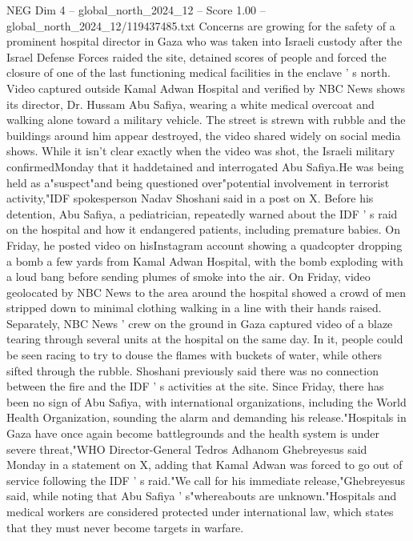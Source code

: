 \begin{textsample}{NEG Dim 4 – global\_north\_2024\_12 – Score 1.00 – global\_north\_2024\_12/119437485.txt}  \label{ex:f4_neg_158}
Concerns are growing for the safety of a prominent hospital director in Gaza who was taken into Israeli custody after the Israel Defense Forces raided the site, detained scores of people and forced the closure of one of the last functioning medical facilities in the enclave ' s north.
Video captured outside Kamal Adwan Hospital and verified by NBC News shows its director, Dr.
Hussam Abu Safiya, wearing a white medical overcoat and walking alone toward a military vehicle.
The street is strewn with rubble and the buildings around him appear destroyed, the video shared widely on social media shows.
While it isn't clear exactly when the video was shot, the Israeli military confirmedMonday that it haddetained and interrogated Abu Safiya.He was being held as a"suspect"and being questioned over"potential involvement in terrorist activity,"IDF spokesperson Nadav Shoshani said in a post on X.
Before his detention, Abu Safiya, a pediatrician, repeatedly warned about the IDF ' s raid on the hospital and how it endangered patients, including premature babies.
On Friday, he posted video on hisInstagram account showing a quadcopter dropping a bomb a few yards from Kamal Adwan Hospital, with the bomb exploding with a loud bang before sending plumes of smoke into the air.
On Friday, video geolocated by NBC News to the area around the hospital showed a crowd of men stripped down to minimal clothing walking in a line with their hands raised.
Separately, NBC News ' crew on the ground in Gaza captured video of a blaze tearing through several units at the hospital on the same day.
In it, people could be seen racing to try to douse the flames with buckets of water, while others sifted through the rubble.
Shoshani previously said there was no connection between the fire and the IDF ' s activities at the site.
Since Friday, there has been no sign of Abu Safiya, with international organizations, including the World Health Organization, sounding the alarm and demanding his release."Hospitals in Gaza have once again become battlegrounds and the health system is under severe threat,"WHO Director-General Tedros Adhanom Ghebreyesus said Monday in a statement on X, adding that Kamal Adwan was forced to go out of service following the IDF ' s raid."We call for his immediate release,"Ghebreyesus said, while noting that Abu Safiya ' s"whereabouts are unknown."Hospitals and medical workers are considered protected under international law, which states that they must never become targets in warfare.

\end{textsample}
